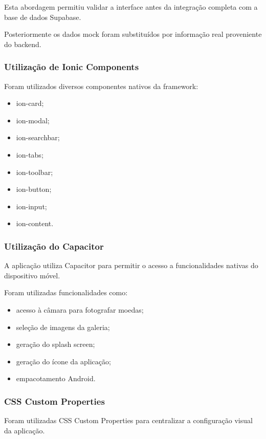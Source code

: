 \documentclass[12pt,a4paper]{article}
\begin{document}
Esta abordagem permitiu validar a interface antes da integração completa com a base de dados Supabase.

Posteriormente os dados mock foram substituídos por informação real proveniente do backend.

\subsubsection{Utilização de Ionic Components}

Foram utilizados diversos componentes nativos da framework:

\begin{itemize}
\setlength{\itemsep}{0.15em}
\item ion-card;
\item ion-modal;
\item ion-searchbar;
\item ion-tabs;
\item ion-toolbar;
\item ion-button;
\item ion-input;
\item ion-content.
\end{itemize}

\subsubsection{Utilização do Capacitor}

A aplicação utiliza Capacitor para permitir o acesso a funcionalidades nativas do dispositivo móvel.

Foram utilizadas funcionalidades como:

\begin{itemize}
\setlength{\itemsep}{0.15em}
\item acesso à câmara para fotografar moedas;
\item seleção de imagens da galeria;
\item geração do splash screen;
\item geração do ícone da aplicação;
\item empacotamento Android.
\end{itemize}

\subsubsection{CSS Custom Properties}

Foram utilizadas CSS Custom Properties para centralizar a configuração visual da aplicação.
\end{document}
